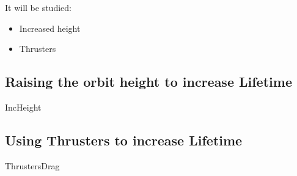 It will be studied:

\begin{itemize}
\item Increased height
\item Thrusters
\end{itemize}

\subsection{Raising the orbit height to increase Lifetime}
{IncHeight}

\subsection{Using Thrusters to increase Lifetime}
{ThrustersDrag}
